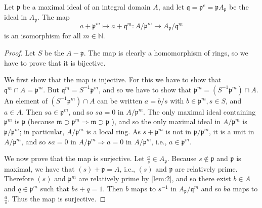 \documentclass[12pt, oneside]{book}
\begin{document}
\begin{lemma}
    Let $\mathfrak{p}$ be a maximal ideal of an integral domain $A$, and let $\mathfrak{q}=\mathfrak{p}^e=\mathfrak{p} A_{\mathfrak{p}}$ be the ideal in $A_{\mathfrak{p}}$. The map
    \begin{equation*}
        a+\mathfrak{p}^m \mapsto a+\mathfrak{q}^m: A / \mathfrak{p}^m \rightarrow A_{\mathfrak{p}} / \mathfrak{q}^m
    \end{equation*}
    is an isomorphism for all $m \in \mathbb{N}$.
    \begin{proof}
        Let $S$ be the $A-\mathfrak{p}$. The map is clearly a homomorphism of rings, so we have to prove that it is bijective.


        We first show that the map is injective. For this we have to show that $\mathfrak{q}^m \cap A=\mathfrak{p}^m$.
        But $\mathfrak{q}^m=S^{-1} \mathfrak{p}^m$, and so we have to show that $\mathfrak{p}^m=\left(S^{-1} \mathfrak{p}^m\right) \cap A$. An element of $\left(S^{-1} \mathfrak{p}^m\right) \cap A$ can be written $a=b / s$ with $b \in \mathfrak{p}^m, s \in S$, and $a \in A$. Then $s a \in \mathfrak{p}^m$, and so $s a=0$ in $A / \mathfrak{p}^m$. The only maximal ideal containing $\mathfrak{p}^m$ is $\mathfrak{p}$ (because $\mathfrak{m} \supset \mathfrak{p}^m \Rightarrow \mathfrak{m} \supset \mathfrak{p}$ ),
        and so the only maximal ideal in $A / \mathfrak{p}^m$ is $\mathfrak{p} / \mathfrak{p}^m$; in particular, $A / \mathfrak{p}^m$ is a local ring. As $s+\mathfrak{p}^m$ is not in $\mathfrak{p} / \mathfrak{p}^m$, it is a unit in $A / \mathfrak{p}^m$, and so $s a=0$ in $A / \mathfrak{p}^m \Rightarrow a=0$ in $A / \mathfrak{p}^m$, i.e., $a \in \mathfrak{p}^m$.

        We now prove that the map is surjective. Let $\frac{a}{s} \in A_{\mathfrak{p}}$. Because $s \notin \mathfrak{p}$ and $\mathfrak{p}$ is maximal, we have that $(s)+\mathfrak{p}=A$, i.e., $\left(s\right)$ and $\mathfrak{p}$ are relatively prime.
        Therefore $\left(s\right)$ and $\mathfrak{p}^m$ are relatively prime by \cref{lem:2}, and so there exist $b \in A$ and $q \in \mathfrak{p}^m$ such that $b s+q=1$. Then $b$ maps to $s^{-1}$ in $A_{\mathfrak{p}} / \mathfrak{q}^m$ and so $b a$ maps to $\frac{a}{s}$. Thus the map is surjective.
    \end{proof}
\end{lemma}
\end{document}
